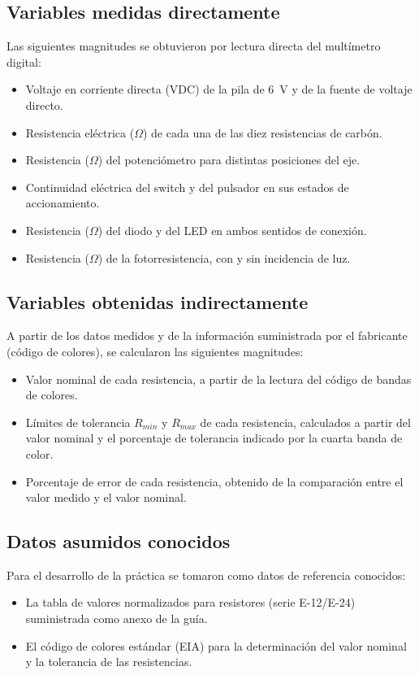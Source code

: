 \subsection{Variables medidas directamente}

Las siguientes magnitudes se obtuvieron por lectura directa del multímetro digital:
\begin{itemize}
    \item Voltaje en corriente directa (VDC) de la pila de 6~V y de la fuente de voltaje directo.
    \item Resistencia eléctrica ($\Omega$) de cada una de las diez resistencias de carbón.
    \item Resistencia ($\Omega$) del potenciómetro para distintas posiciones del eje.
    \item Continuidad eléctrica del switch y del pulsador en sus estados de accionamiento.
    \item Resistencia ($\Omega$) del diodo y del LED en ambos sentidos de conexión.
    \item Resistencia ($\Omega$) de la fotorresistencia, con y sin incidencia de luz.
\end{itemize}

\subsection{Variables obtenidas indirectamente}

A partir de los datos medidos y de la información suministrada por el fabricante (código de colores), se calcularon las siguientes magnitudes:
\begin{itemize}
    \item Valor nominal de cada resistencia, a partir de la lectura del código de bandas de colores.
    \item Límites de tolerancia $R_{min}$ y $R_{max}$ de cada resistencia, calculados a partir del valor nominal y el porcentaje de tolerancia indicado por la cuarta banda de color.
    \item Porcentaje de error de cada resistencia, obtenido de la comparación entre el valor medido y el valor nominal.
\end{itemize}

\subsection{Datos asumidos conocidos}

Para el desarrollo de la práctica se tomaron como datos de referencia conocidos:
\begin{itemize}
    \item La tabla de valores normalizados para resistores (serie E-12/E-24) suministrada como anexo de la guía.
    \item El código de colores estándar (EIA) para la determinación del valor nominal y la tolerancia de las resistencias.
\end{itemize}

